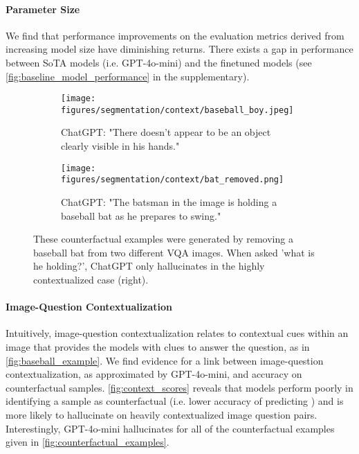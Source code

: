 \vspace{-2mm}
\paragraph{Parameter Size}
We find that performance improvements on the evaluation metrics derived from increasing model size have diminishing returns. There exists a gap in performance between SoTA models (i.e. GPT-4o-mini) and the finetuned models (see \autoref{fig:baseline_model_performance} in the supplementary).

\begin{figure}
    \centering
    \begin{subfigure}[b]{0.22\textwidth}
        \centering
        \texttt{[image: figures/segmentation/context/baseball\_boy.jpeg]}  %
        \caption{ChatGPT: "There doesn’t appear to be an object clearly visible in his hands."}
        \label{fig:bat_boy}
    \end{subfigure}%
    \hfill
    \begin{subfigure}[b]{0.22\textwidth}
        \centering
        \texttt{[image: figures/segmentation/context/bat\_removed.png]}  %
        \caption{ChatGPT: "The batsman in the image is holding a baseball bat as he prepares to swing."}
        \label{fig:bat_batsman}
    \end{subfigure}
    \caption{These counterfactual examples were generated by removing a baseball bat from two different VQA images. When asked 'what is he holding?', ChatGPT only hallucinates in the highly contextualized case (right).}
    \label{fig:baseball_example}
\end{figure}


\paragraph{Image-Question Contextualization}
Intuitively, image-question contextualization relates to contextual cues within an image that provides the models with clues to answer the question, as in \autoref{fig:baseball_example}. We find evidence for a link between image-question contextualization, as approximated by GPT-4o-mini, and accuracy on counterfactual samples. \autoref{fig:context_scores} reveals that models perform poorly in identifying a sample as counterfactual (i.e. lower accuracy of predicting \retlabel) and is more likely to hallucinate on heavily contextualized image question pairs. Interestingly, GPT-4o-mini hallucinates for all of the counterfactual examples given in \autoref{fig:counterfactual_examples}.

